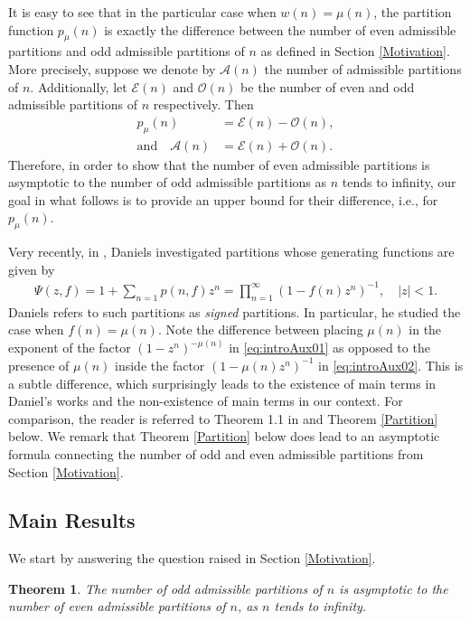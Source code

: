 \documentclass[11pt]{amsart}
\numberwithin{equation}{section}
\numberwithin{figure}{section}
\newtheorem{theorem}{Theorem}[section]
\theoremstyle{definition}
\begin{document}
It is easy to see that in the particular case when $w(n)= \mu(n)$, the partition function $p_{\mu}(n)$ is exactly the difference between the number of even admissible partitions and odd admissible partitions of $n$ as defined in Section \ref{Motivation}. More precisely, suppose we denote by $\mathcal{A}(n)$ the number of admissible partitions of $n$. Additionally, let $\mathcal{E}(n)$ and $\mathcal{O}(n)$ be the number of even and odd admissible partitions of $n$ respectively. Then
\begin{align}\label{difference}
p_{\mu}(n) &= \mathcal{E}(n)-\mathcal{O}(n),\\
\textrm{and} \quad \mathcal{A}(n) &= \mathcal{E}(n)+\mathcal{O}(n).
\end{align}
Therefore, in order to show that the number of even admissible partitions is asymptotic to the number of odd admissible partitions as $n$ tends to infinity, our goal in what follows is to provide an upper bound for their difference, i.e., for $p_{\mu}(n)$. 

Very recently, in \cite{daniels1, daniels2}, Daniels investigated partitions whose generating functions are given by
\begin{align} \label{eq:introAux02}
    \Psi(z,f) = 1 + \sum_{n=1} p(n,f) z^n = \prod_{n=1}^\infty (1- f(n)z^n)^{-1}, \quad \lvert z \rvert <1. 
\end{align}
Daniels refers to such partitions as \textit{signed} partitions. In particular, he studied the case when $f(n) = \mu(n)$. Note the difference between placing $\mu(n)$ in the exponent of the factor $(1-z^n)^{-\mu(n)}$ in \eqref{eq:introAux01} as opposed to the presence of $\mu(n)$ inside the factor $(1-\mu(n)z^n)^{-1}$ in \eqref{eq:introAux02}. This is a subtle difference, which surprisingly leads to the existence of main terms in Daniel's works and the non-existence of main terms in our context. For comparison, the reader is referred to Theorem 1.1 in \cite{daniels1} and Theorem \ref{Partition} below. 
We remark that Theorem \ref{Partition} below does lead to an asymptotic formula connecting the number of odd and even admissible partitions from Section \ref{Motivation}.  
\subsection{Main Results} We start by answering the question raised in Section \ref{Motivation}.

\begin{theorem}\label{asymptotic}
The number of odd admissible partitions of $n$ is asymptotic to the number of even admissible partitions of $n$, as $n$ tends to infinity.
\end{theorem}
\end{document}
